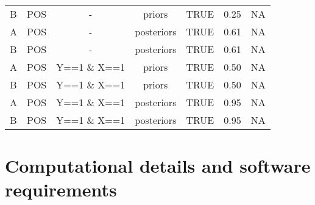 \documentclass[
  11pt,
  article]{jss}
\begin{document}
\begin{longtable}[t]{ccccccc}
\addlinespace
B & POS & - & priors & TRUE & 0.25 & NA\\
A & POS & - & posteriors & TRUE & 0.61 & NA\\
B & POS & - & posteriors & TRUE & 0.61 & NA\\
A & POS & Y==1 \& X==1 & priors & TRUE & 0.50 & NA\\
B & POS & Y==1 \& X==1 & priors & TRUE & 0.50 & NA\\
\addlinespace
A & POS & Y==1 \& X==1 & posteriors & TRUE & 0.95 & NA\\
B & POS & Y==1 \& X==1 & posteriors & TRUE & 0.95 & NA\\
\bottomrule
\end{longtable}

\FloatBarrier

\newpage{}

\hypertarget{computational-details-and-software-requirements}{%
\section*{Computational details and software
requirements}\label{computational-details-and-software-requirements}}
\end{document}
